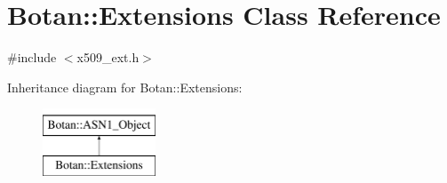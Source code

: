 \hypertarget{classBotan_1_1Extensions}{\section{Botan\-:\-:Extensions Class Reference}
\label{classBotan_1_1Extensions}
}


{\ttfamily \#include $<$x509\-\_\-ext.\-h$>$}

Inheritance diagram for Botan\-:\-:Extensions\-:\begin{figure}[H]
\begin{center}
\leavevmode
\includegraphics[height=2.000000cm]{classBotan_1_1Extensions}
\end{center}
\end{figure}
